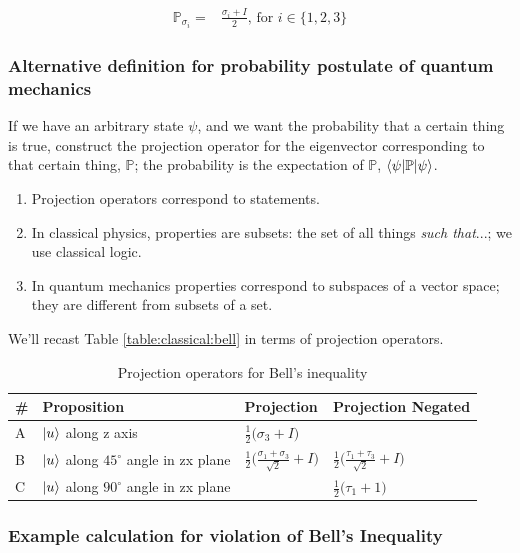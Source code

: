 \documentclass[]{article}
\begin{document}
\begin{align*}
	\mathbb{P}_{\sigma_i} =& \frac{\sigma_i + I}{2} \text{, for $i \in \{1,2, 3\}$}
\end{align*}

\subsubsection{Alternative definition  for probability postulate of quantum mechanics}
If we have an arbitrary state $\psi$, and we want the probability that a certain thing is true, construct the projection operator for the eigenvector corresponding to that certain thing, $\mathbb{P}$; the probability is the expectation of $\mathbb{P}$, $\braket{\psi|\mathbb{P}|\psi}$.

\begin{enumerate}
	\item Projection operators correspond to statements.
	\item In classical physics, properties are subsets: the set of all things \emph{such that}...; we use classical logic.
	\item In quantum mechanics properties correspond to subspaces of a vector space; they are different from subsets of a set. 
\end{enumerate}

We'll recast Table \ref{table:classical:bell} in terms of projection operators.
\begin{table}[H]
	\caption{Projection operators for Bell's inequality}\label{table:projection:bell}
	\begin{center}
		\begin{tabular}{|l|l|l|l|}\hline
			\#&Proposition&Projection & Projection Negated\\ \hline 
			A& $\ket{u}$ along z axis&$\frac{1}{2}\big(\sigma_3 + I\big)$&\\ \hline
			B&$ \ket{u}$ along $45^{\circ}$ angle in zx plane&$\frac{1}{2}\big(\frac{\sigma_1+\sigma_3}{\sqrt{2}}+I\big)$&$\frac{1}{2}\big(\frac{\tau_1+\tau_3}{\sqrt{2}}+I\big)$\\ \hline
			C&$ \ket{u}$ along $90^{\circ}$ angle in zx plane&&$\frac{1}{2}\big(\tau_1+1\big)$\\ \hline
		\end{tabular}
	\end{center}
\end{table}

\subsubsection{Example calculation for violation of Bell's Inequality}
\end{document}
